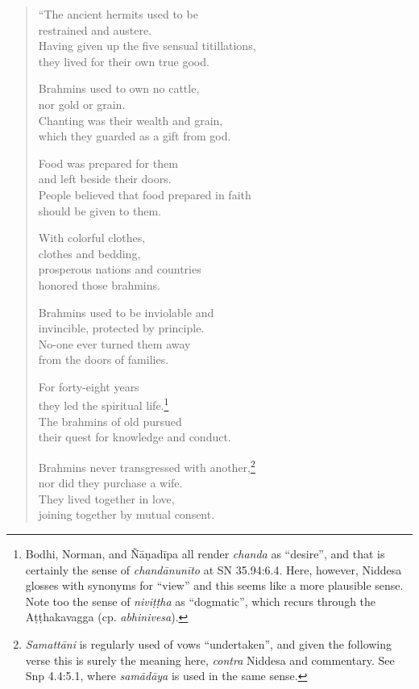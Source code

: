 \documentclass[12pt,openany]{book}%
\begin{document}
\begin{verse}%
“The ancient hermits used to be \\
restrained and austere. \\
Having given up the five sensual titillations, \\
they lived for their own true good. 

Brahmins used to own no cattle, \\
nor gold or grain. \\
Chanting was their wealth and grain, \\
which they guarded as a gift from god. 

Food was prepared for them \\
and left beside their doors. \\
People believed that food prepared in faith \\
should be given to them. 

With colorful clothes, \\
clothes and bedding, \\
prosperous nations and countries \\
honored those brahmins. 

Brahmins used to be inviolable and \\
invincible, protected by principle. \\
No-one ever turned them away \\
from the doors of families. 

For forty-eight years \\
they led the spiritual life.\footnote{Bodhi, Norman, and \textsanskrit{Ñāṇadīpa} all render \textit{chanda} as “desire”, and that is certainly the sense of \textit{\textsanskrit{chandānunīto}} at SN 35.94:6.4. Here, however, Niddesa glosses with synonyms for “view” and this seems like a more plausible sense. Note too the sense of \textit{\textsanskrit{niviṭṭha}} as “dogmatic”, which recurs through the \textsanskrit{Aṭṭhakavagga} (cp. \textit{abhinivesa}). } \\
The brahmins of old pursued \\
their quest for knowledge and conduct. 

Brahmins never transgressed with another,\footnote{\textit{\textsanskrit{Samattāni}} is regularly used of vows “undertaken”, and given the following verse this is surely the meaning here, \emph{contra} Niddesa and commentary. See Snp 4.4:5.1, where \textit{\textsanskrit{samādāya}} is used in the same sense. } \\
nor did they purchase a wife. \\
They lived together in love, \\
joining together by mutual consent. 


\end{verse}
\end{document}
